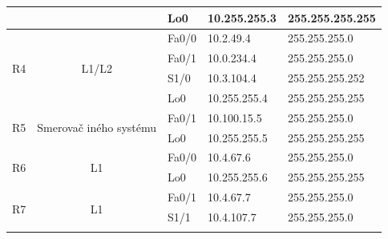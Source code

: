 \documentclass[12pt,twoside,a4paper]{report}
\begin{document}
\begin{table}[!htb]
\begin{tabular}{|c|c|l|l|l|}
                     &                                         & Lo0                                     & 10.255.255.3                            & 255.255.255.255                     \\ \hline
\multirow{4}{*}{R4}  & \multirow{4}{*}{L1/L2}                    & Fa0/0                                   & 10.2.49.4                               & 255.255.255.0                       \\ \cline{3-5} 
                     &                                         & Fa0/1                                   & 10.0.234.4                              & 255.255.255.0                       \\ \cline{3-5} 
                     &                                         & S1/0                                    & 10.3.104.4                              & 255.255.255.252                     \\ \cline{3-5} 
                     &                                         & Lo0                                     & 10.255.255.4                            & 255.255.255.255                     \\ \hline
\multirow{2}{*}{R5}  & \multirow{2}{*}{Smerovač iného systému} & Fa0/1                                   & 10.100.15.5                             & 255.255.255.0                       \\ \cline{3-5} 
                     &                                         & Lo0                                     & 10.255.255.5                            & 255.255.255.255                     \\ \hline
\multirow{2}{*}{R6}  & \multirow{2}{*}{L1}             & Fa0/0                                   & 10.4.67.6                               & 255.255.255.0                       \\ \cline{3-5} 
                     &                                         & Lo0                                     & 10.255.255.6                            & 255.255.255.255                     \\ \hline
\multirow{3}{*}{R7}  & \multirow{3}{*}{L1}             & Fa0/1                                   & 10.4.67.7                               & 255.255.255.0                       \\ \cline{3-5} 
                     &                                         & S1/1                                    & 10.4.107.7                              & 255.255.255.0                       \\ \cline{3-5} 

\end{tabular}
\end{table}
\end{document}
